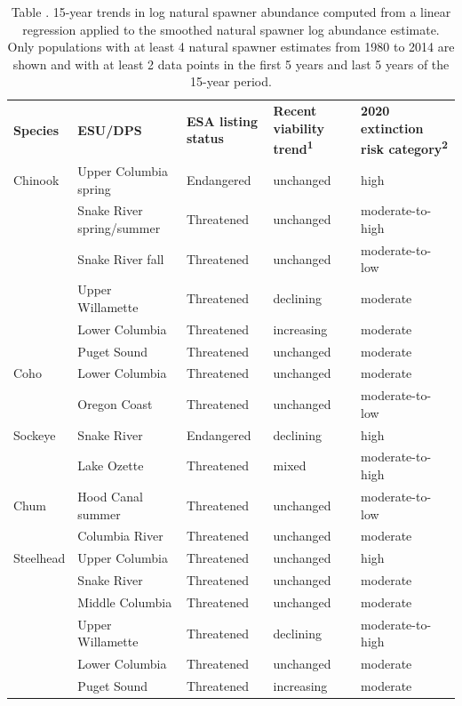 \documentclass[
  letterpaper,
  oneside,
  open=any]{scrbook}
\begin{document}
\begin{longtable}[]{@{}
  >{\raggedright\arraybackslash}p{}
  >{\raggedright\arraybackslash}p{}
  >{\raggedright\arraybackslash}p{}
  >{\raggedright\arraybackslash}p{}
  >{\raggedright\arraybackslash}p{}@{}}
\caption{Table . 15-year trends in log natural spawner abundance
computed from a linear regression applied to the smoothed natural
spawner log abundance estimate. Only populations with at least 4 natural
spawner estimates from 1980 to 2014 are shown and with at least 2 data
points in the first 5 years and last 5 years of the 15-year
period.}\tabularnewline
\toprule()
\endhead
\textbf{Species} & \textbf{ESU/DPS} & \textbf{ESA listing status} &
\textbf{Recent viability trend\textsuperscript{1}} & \textbf{2020
extinction risk category\textsuperscript{2}} \\
Chinook & Upper Columbia spring & Endangered & unchanged & high \\
& Snake River spring/summer & Threatened & unchanged &
moderate-to-high \\
& Snake River fall & Threatened & unchanged & moderate-to-low \\
& Upper Willamette & Threatened & declining & moderate \\
& Lower Columbia & Threatened & increasing & moderate \\
& Puget Sound & Threatened & unchanged & moderate \\
Coho & Lower Columbia & Threatened & unchanged & moderate \\
& Oregon Coast & Threatened & unchanged & moderate-to-low \\
Sockeye & Snake River & Endangered & declining & high \\
& Lake Ozette & Threatened & mixed & moderate-to-high \\
Chum & Hood Canal summer & Threatened & unchanged & moderate-to-low \\
& Columbia River & Threatened & unchanged & moderate \\
Steelhead & Upper Columbia & Threatened & unchanged & high \\
& Snake River & Threatened & unchanged & moderate \\
& Middle Columbia & Threatened & unchanged & moderate \\
& Upper Willamette & Threatened & declining & moderate-to-high \\
& Lower Columbia & Threatened & unchanged & moderate \\
& Puget Sound & Threatened & increasing & moderate \\
\bottomrule()
\end{longtable}
\end{document}
